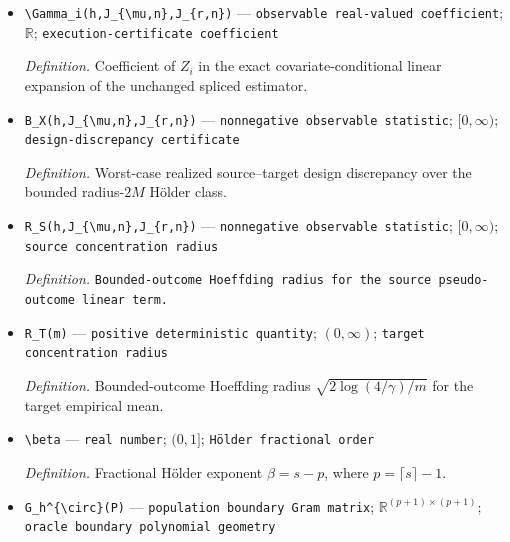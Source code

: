 \documentclass{article}
\begin{document}
\begin{itemize}
  \par\smallskip\noindent\emph{Definition.} Coefficient of source pseudo-outcome \(Z_i\) in the fold-\(k\) boundary-spliced regression evaluation.
  \item \texttt{\textbackslash{}\allowbreak{}Gamma\_\allowbreak{}i(h,\allowbreak{}J\_\allowbreak{}\{\textbackslash{}\allowbreak{}mu,\allowbreak{}n\}\allowbreak{},\allowbreak{}J\_\allowbreak{}\{r,\allowbreak{}n\}\allowbreak{})} --- \texttt{observable real-\allowbreak{}valued coefficient}; \(\mathbb R\); \texttt{execution-\allowbreak{}certificate coefficient}
  \par\smallskip\noindent\emph{Definition.} Coefficient of \(Z_i\) in the exact covariate-conditional linear expansion of the unchanged spliced estimator.
  \item \texttt{B\_\allowbreak{}X(h,\allowbreak{}J\_\allowbreak{}\{\textbackslash{}\allowbreak{}mu,\allowbreak{}n\}\allowbreak{},\allowbreak{}J\_\allowbreak{}\{r,\allowbreak{}n\}\allowbreak{})} --- \texttt{nonnegative observable statistic}; \([0,\infty)\); \texttt{design-\allowbreak{}discrepancy certificate}
  \par\smallskip\noindent\emph{Definition.} Worst-case realized source--target design discrepancy over the bounded radius-\(2M\) Hölder class.
  \item \texttt{R\_\allowbreak{}S(h,\allowbreak{}J\_\allowbreak{}\{\textbackslash{}\allowbreak{}mu,\allowbreak{}n\}\allowbreak{},\allowbreak{}J\_\allowbreak{}\{r,\allowbreak{}n\}\allowbreak{})} --- \texttt{nonnegative observable statistic}; \([0,\infty)\); \texttt{source concentration radius}
  \par\smallskip\noindent\emph{Definition.} \texttt{Bounded-\allowbreak{}outcome Hoeffding radius for the source pseudo-\allowbreak{}outcome linear term.}
  \item \texttt{R\_\allowbreak{}T(m)} --- \texttt{positive deterministic quantity}; \((0,\infty)\); \texttt{target concentration radius}
  \par\smallskip\noindent\emph{Definition.} Bounded-outcome Hoeffding radius \(\sqrt{2\log(4/\gamma)/m}\) for the target empirical mean.
  \item \texttt{\textbackslash{}\allowbreak{}beta} --- \texttt{real number}; \((0,1]\); \texttt{Hölder fractional order}
  \par\smallskip\noindent\emph{Definition.} Fractional Hölder exponent \(\beta=s-p\), where \(p=\lceil s\rceil-1\).
  \item \texttt{G\_\allowbreak{}h\textasciicircum{}\{\textbackslash{}\allowbreak{}circ\}\allowbreak{}(P)} --- \texttt{population boundary Gram matrix}; \(\mathbb R^{(p+1)\times(p+1)}\); \texttt{oracle boundary polynomial geometry}

\end{itemize}
\end{document}
